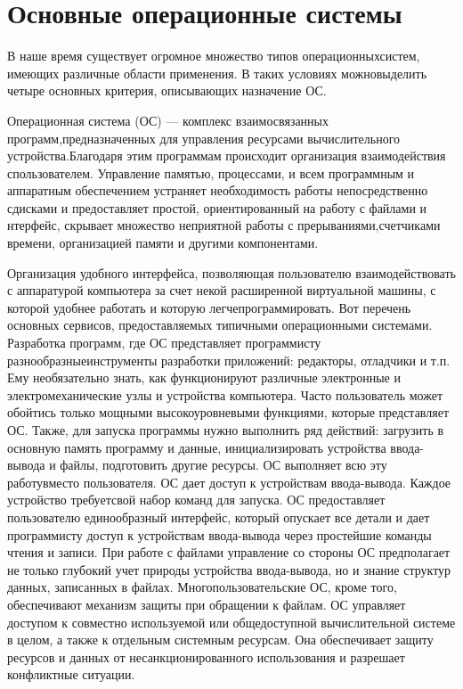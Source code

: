 \section{Основные операционные системы}

В наше время существует огромное множество типов операционныхсистем, имеющих различные области применения. В таких условиях можновыделить четыре основных критерия, описывающих назначение ОС.

Операционная система (ОС) — комплекс взаимосвязанных программ,предназначенных   для   управления   ресурсами   вычислительного   устройства.Благодаря   этим   программам   происходит   организация   взаимодействия   спользователем.  Управление   памятью,   процессами,   и   всем   программным   и аппаратным обеспечением устраняет необходимость работы непосредственно сдисками и предоставляет простой, ориентированный на работу с файлами и нтерфейс,   скрывает   множество   неприятной   работы   с   прерываниями,счетчиками времени, организацией памяти и другими компонентами.~\cite{Oc1}

Организация   удобного   интерфейса,   позволяющая   пользователю взаимодействовать   с  аппаратурой   компьютера   за   счет   некой   расширенной виртуальной   машины,   с   которой   удобнее   работать   и   которую   легчепрограммировать. Вот   перечень   основных   сервисов,   предоставляемых типичными операционными системами. Разработка программ, где ОС представляет программисту разнообразныеинструменты разработки приложений: редакторы, отладчики и т.п. Ему необязательно   знать,   как   функционируют   различные   электронные   и электромеханические узлы и устройства компьютера. Часто пользователь может обойтись   только   мощными   высокоуровневыми   функциями,   которые представляет ОС. Также, для запуска программы нужно выполнить ряд действий: загрузить в основную память программу и данные, инициализировать устройства ввода-вывода и файлы, подготовить другие ресурсы. ОС выполняет всю эту работувместо пользователя. ОС дает доступ к устройствам ввода-вывода. Каждое устройство требуетсвой набор команд для запуска. ОС предоставляет пользователю единообразный интерфейс,   который   опускает   все   детали   и   дает   программисту   доступ   к устройствам ввода-вывода через простейшие команды чтения и записи. При работе с файлами управление со стороны ОС предполагает не только глубокий учет природы устройства ввода-вывода, но и знание структур данных, записанных в файлах. Многопользовательские ОС, кроме того, обеспечивают механизм защиты при обращении к файлам. ОС управляет доступом к совместно используемой или общедоступной вычислительной системе в целом, а также к отдельным системным ресурсам. Она   обеспечивает   защиту   ресурсов   и   данных   от   несанкционированного использования и разрешает конфликтные ситуации.


